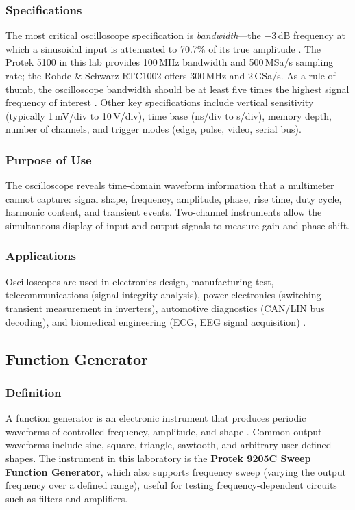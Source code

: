 \documentclass[12pt, a4paper, twoside]{report}
\begin{document}
\subsubsection*{Specifications}
The most critical oscilloscope specification is \textit{bandwidth}---the $-3$\,dB
frequency at which a sinusoidal input is attenuated to 70.7\% of its true amplitude
\cite{tek:oscilloscope}. The Protek 5100 in this lab provides 100\,MHz bandwidth and
500\,MSa/s sampling rate; the Rohde \& Schwarz RTC1002 offers 300\,MHz and 2\,GSa/s.
As a rule of thumb, the oscilloscope bandwidth should be at least five times the highest
signal frequency of interest \cite{keysight:bandwidth}. Other key specifications include
vertical sensitivity (typically 1\,mV/div to 10\,V/div), time base
(ns/div to s/div), memory depth, number of channels, and trigger modes (edge, pulse,
video, serial bus).

\subsubsection*{Purpose of Use}
The oscilloscope reveals time-domain waveform information that a multimeter cannot
capture: signal shape, frequency, amplitude, phase, rise time, duty cycle, harmonic
content, and transient events. Two-channel instruments allow the simultaneous display of
input and output signals to measure gain and phase shift.

\subsubsection*{Applications}
Oscilloscopes are used in electronics design, manufacturing test, telecommunications
(signal integrity analysis), power electronics (switching transient measurement in
inverters), automotive diagnostics (CAN/LIN bus decoding), and biomedical engineering
(ECG, EEG signal acquisition) \cite{wiki:oscilloscope}.

\subsection{Function Generator}

\subsubsection*{Definition}
A function generator is an electronic instrument that produces periodic waveforms of
controlled frequency, amplitude, and shape \cite{horowitz2015}. Common output waveforms
include sine, square, triangle, sawtooth, and arbitrary user-defined shapes. The
instrument in this laboratory is the \textbf{Protek 9205C Sweep Function Generator},
which also supports frequency sweep (varying the output frequency over a defined range),
useful for testing frequency-dependent circuits such as filters and amplifiers.
\end{document}
